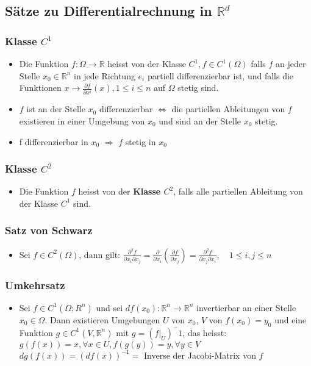 \documentclass[a3paper, 11pt, landscape]{scrartcl}
\newcommand{\Rd}{\mathbb{R}^d}
\newcommand{\Rn}{\mathbb{R}^n}
\begin{document}
\begin{multicols*}{3}
	\subsection{Sätze zu Differentialrechnung in $\Rd$}
	\subsubsection{Klasse $C^1$}
	\begin{itemize}
	    \item Die Funktion $f:\Omega\to\mathbb{R}$ heisst von der Klasse $C^1 ,f\in C^1(\Omega )$ falls $f$ an jeder Stelle $x_0\in \Rn$ in jede Richtung $e_i$ partiell differenzierbar ist, und falls die Funktionen $x \to \frac{\partial f}{\partial x^i} (x) , 1 \leq i \leq n$ auf $\Omega$ stetig sind.
	    \item $f$ ist an der Stelle $x_0$ differenzierbar $\iff$ die partiellen Ableitungen von $f$ existieren in einer Umgebung von $x_0$ und sind an der Stelle $x_0$ stetig.
	    \item f differenzierbar in $x_0$ $\Rightarrow$ $f$ stetig in $x_0$
	\end{itemize}
	
	\subsubsection{Klasse $C^2$}
	\begin{itemize}
	    \item Die Funktion $f$ heisst von der \textbf{Klasse $C^2$}, falls alle partiellen Ableitung von der Klasse $C^1$ sind.
	\end{itemize}
	
	\subsubsection{Satz von Schwarz}
	\begin{itemize}
	    \item Sei $f\in C^2(\Omega)$, dann gilt: $\frac{\partial ^2 f}{\partial x_i\partial x_j}=\frac{\partial }{\partial x_i}(\frac{\partial f}{\partial x_j})=\frac{\partial ^2 f}{\partial x_j\partial x_i}, \quad 1\leq i,j \leq n$
	\end{itemize}
	
	\subsubsection{Umkehrsatz}
	\begin{itemize}
	    \item Sei $f\in C^1(\Omega; R^n)$ und sei $ df(x_0):\Rn\to\Rn$ invertierbar an einer Stelle $x_0\in\Omega$. Dann existieren Umgebungen $U$ von $x_0$, $V$ von $f(x_0)=y_0$ und eine Funktion $g\in C^1(V,\Rn)$ mit $g=(f|_U)^-1$, das heisst:\\
	    $g(f(x))=x,\forall x \in U, f(g(y))=y,\forall y\in V$\\
	    $dg(f(x))=(df(x))^{-1}=$ Inverse der Jacobi-Matrix von $f$
	\end{itemize}
	

\end{multicols*}
\end{document}
